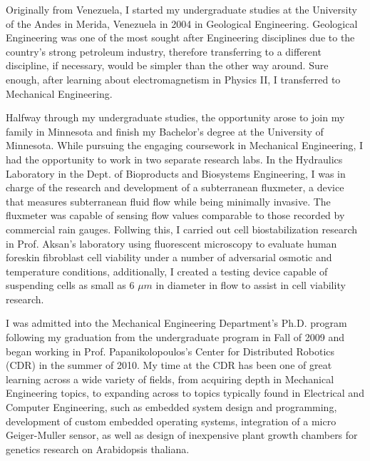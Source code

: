 
\begin{singlespace}
Originally from Venezuela, I started my undergraduate studies at the University of the Andes in Merida, Venezuela in 2004 in Geological Engineering. Geological Engineering was one of the most sought after Engineering disciplines due to the country's strong petroleum industry, therefore transferring to a different discipline, if necessary, would be simpler than the other way around. Sure enough, after learning about electromagnetism in Physics II, I transferred to Mechanical Engineering. 

Halfway through my undergraduate studies, the opportunity arose to join my family in Minnesota and finish my Bachelor's degree at the University of Minnesota. While pursuing the engaging coursework in Mechanical Engineering, I had the opportunity to work in two separate research labs. In the Hydraulics Laboratory in the Dept. of Bioproducts and Biosystems Engineering, I was in charge of the research and development of a subterranean fluxmeter, a device that measures subterranean fluid flow while being minimally invasive. The fluxmeter was capable of sensing flow values comparable to those recorded by commercial rain gauges. Follwing this, I carried out cell biostabilization research in Prof. Aksan's laboratory using fluorescent microscopy to evaluate human foreskin fibroblast cell viability under a number of adversarial osmotic and temperature conditions, additionally, I created a testing device capable of suspending cells as small as 6 $\mu m $ in diameter in flow to assist in cell viability research. 

I was admitted into the Mechanical Engineering Department's Ph.D. program following my graduation from the undergraduate program in Fall of 2009 and began working in Prof. Papanikolopoulos's Center for Distributed Robotics (CDR) in the summer of 2010. My time at the CDR has been one of great learning across a wide variety of fields, from acquiring depth in Mechanical Engineering topics, to expanding across to topics typically found in Electrical and Computer Engineering, such as embedded system design and programming, development of custom embedded operating systems, integration of a micro Geiger-Muller sensor, as well as design of inexpensive plant growth chambers for genetics research on Arabidopsis thaliana. 


\end{singlespace}

